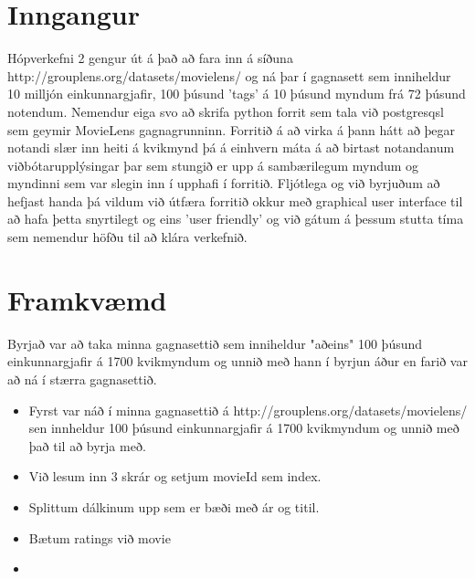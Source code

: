 \documentclass[12pt, git, final]{rureport}
\begin{document}
\maketitle  %



\section{Inngangur} %

Hópverkefni 2 gengur út á það að fara inn á síðuna http://grouplens.org/datasets/movielens/ og ná þar í gagnasett sem inniheldur 10 milljón einkunnargjafir, 100 þúsund 'tags' á 10 þúsund myndum frá 72 þúsund notendum.
\newline
Nemendur eiga svo að skrifa python forrit sem tala við postgresqsl sem geymir MovieLens gagnagrunninn. Forritið á að virka á þann hátt að þegar notandi slær inn heiti á kvikmynd þá á einhvern máta á að birtast notandanum viðbótarupplýsingar þar sem stungið er upp á sambærilegum myndum og myndinni sem var slegin inn í upphafi í forritið.
\newline
\newline
Fljótlega og við byrjuðum að hefjast handa þá vildum við útfæra forritið okkur með graphical user interface til að hafa þetta snyrtilegt og eins 'user friendly' og við gátum á þessum stutta tíma sem nemendur höfðu til að klára verkefnið.
\section{Framkvæmd}
Byrjað var að taka minna gagnasettið sem inniheldur "aðeins" 100 þúsund einkunnargjafir á 1700 kvikmyndum og unnið með hann í byrjun áður en farið var að ná í stærra gagnasettið.
\begin{itemize} 
	\item Fyrst var náð í minna gagnasettið á http://grouplens.org/datasets/movielens/ sen innheldur 100 þúsund einkunnargjafir á 1700 kvikmyndum og unnið með það til að byrja með.
	\item Við lesum inn 3 skrár og setjum movieId sem index.
	\item Splittum dálkinum upp sem er bæði með ár og titil.
	\item Bætum ratings við movie 
	\item 
\end{itemize}
 
\end{document}
